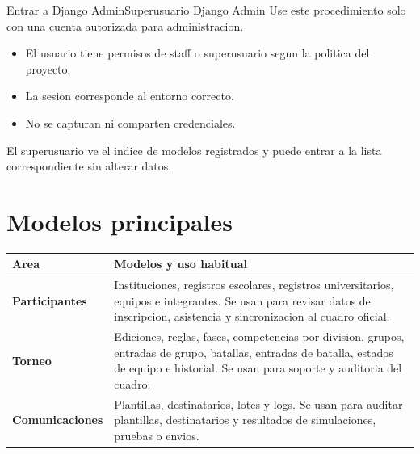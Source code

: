 \begin{procedimiento}{Entrar a Django Admin}{Superusuario Django Admin}
Use este procedimiento solo con una cuenta autorizada para administracion.
\end{procedimiento}

\begin{precondiciones}
\begin{itemize}
    \item El usuario tiene permisos de staff o superusuario segun la politica del proyecto.
    \item La sesion corresponde al entorno correcto.
    \item No se capturan ni comparten credenciales.
\end{itemize}
\end{precondiciones}


\begin{resultadoesperado}
El superusuario ve el indice de modelos registrados y puede entrar a la lista correspondiente sin alterar datos.
\end{resultadoesperado}

\section{Modelos principales}

\begin{tabularx}{\linewidth}{>{\bfseries}p{4cm}X}
\toprule
Area & Modelos y uso habitual\\
\midrule
Participantes & Instituciones, registros escolares, registros universitarios, equipos e integrantes. Se usan para revisar datos de inscripcion, asistencia y sincronizacion al cuadro oficial.\\
Torneo & Ediciones, reglas, fases, competencias por division, grupos, entradas de grupo, batallas, entradas de batalla, estados de equipo e historial. Se usan para soporte y auditoria del cuadro.\\
Comunicaciones & Plantillas, destinatarios, lotes y logs. Se usan para auditar plantillas, destinatarios y resultados de simulaciones, pruebas o envios.\\
\bottomrule
\end{tabularx}

